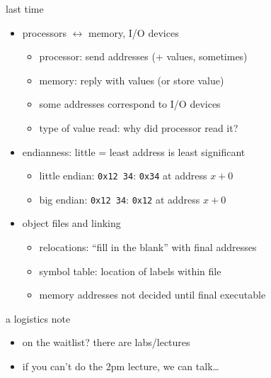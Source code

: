 \begin{frame}{last time}
    \begin{itemize}
    \item processors $\leftrightarrow$ memory, I/O devices
        \begin{itemize}
        \item processor: send addresses (+ values, sometimes)
        \item memory: reply with values (or store value)
        \item some addresses correspond to I/O devices
        \item type of value read: why did processor read it?
        \end{itemize}
    \item endianness: little = least address is least significant
        \begin{itemize}
            \item little endian: {\tt 0x12\,34}: {\tt 0x34} at address $x+0$ 
            \item big endian: {\tt 0x12\,34}: {\tt 0x12} at address $x+0$
        \end{itemize}
    \item object files and linking
        \begin{itemize}
        \item relocations: ``fill in the blank'' with final addresses
        \item symbol table: location of labels within file
        \item memory addresses not decided until final executable
        \end{itemize}
    \end{itemize}
\end{frame}

\begin{frame}{a logistics note}
    \begin{itemize}
        \item on the waitlist? there are labs/lectures 
        \item if you can't do the 2pm lecture, we can talk\ldots
    \end{itemize}
\end{frame}
